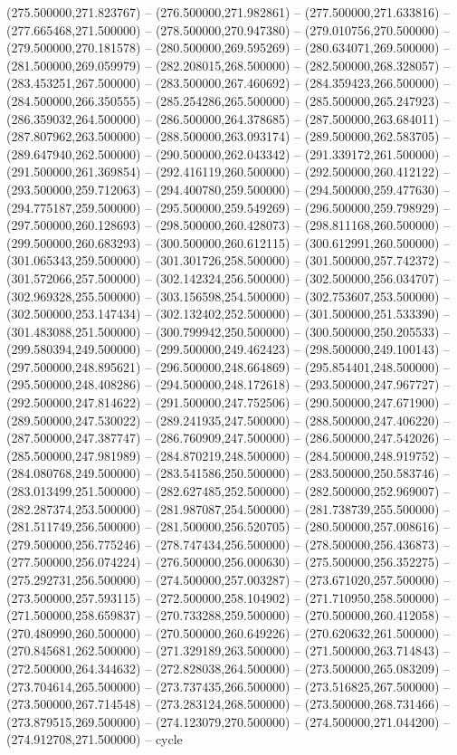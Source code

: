   (275.500000,271.823767) -- (276.500000,271.982861) -- (277.500000,271.633816) -- (277.665468,271.500000) -- (278.500000,270.947380) -- (279.010756,270.500000) -- (279.500000,270.181578) -- (280.500000,269.595269) -- (280.634071,269.500000) -- (281.500000,269.059979) -- (282.208015,268.500000) -- (282.500000,268.328057) -- (283.453251,267.500000) -- (283.500000,267.460692) -- (284.359423,266.500000) -- (284.500000,266.350555) -- (285.254286,265.500000) -- (285.500000,265.247923) -- (286.359032,264.500000) -- (286.500000,264.378685) -- (287.500000,263.684011) -- (287.807962,263.500000) -- (288.500000,263.093174) -- (289.500000,262.583705) -- (289.647940,262.500000) -- (290.500000,262.043342) -- (291.339172,261.500000) -- (291.500000,261.369854) -- (292.416119,260.500000) -- (292.500000,260.412122) -- (293.500000,259.712063) -- (294.400780,259.500000) -- (294.500000,259.477630) -- (294.775187,259.500000) -- (295.500000,259.549269) -- (296.500000,259.798929) -- (297.500000,260.128693) -- (298.500000,260.428073) -- (298.811168,260.500000) -- (299.500000,260.683293) -- (300.500000,260.612115) -- (300.612991,260.500000) -- (301.065343,259.500000) -- (301.301726,258.500000) -- (301.500000,257.742372) -- (301.572066,257.500000) -- (302.142324,256.500000) -- (302.500000,256.034707) -- (302.969328,255.500000) -- (303.156598,254.500000) -- (302.753607,253.500000) -- (302.500000,253.147434) -- (302.132402,252.500000) -- (301.500000,251.533390) -- (301.483088,251.500000) -- (300.799942,250.500000) -- (300.500000,250.205533) -- (299.580394,249.500000) -- (299.500000,249.462423) -- (298.500000,249.100143) -- (297.500000,248.895621) -- (296.500000,248.664869) -- (295.854401,248.500000) -- (295.500000,248.408286) -- (294.500000,248.172618) -- (293.500000,247.967727) -- (292.500000,247.814622) -- (291.500000,247.752506) -- (290.500000,247.671900) -- (289.500000,247.530022) -- (289.241935,247.500000) -- (288.500000,247.406220) -- (287.500000,247.387747) -- (286.760909,247.500000) -- (286.500000,247.542026) -- (285.500000,247.981989) -- (284.870219,248.500000) -- (284.500000,248.919752) -- (284.080768,249.500000) -- (283.541586,250.500000) -- (283.500000,250.583746) -- (283.013499,251.500000) -- (282.627485,252.500000) -- (282.500000,252.969007) -- (282.287374,253.500000) -- (281.987087,254.500000) -- (281.738739,255.500000) -- (281.511749,256.500000) -- (281.500000,256.520705) -- (280.500000,257.008616) -- (279.500000,256.775246) -- (278.747434,256.500000) -- (278.500000,256.436873) -- (277.500000,256.074224) -- (276.500000,256.000630) -- (275.500000,256.352275) -- (275.292731,256.500000) -- (274.500000,257.003287) -- (273.671020,257.500000) -- (273.500000,257.593115) -- (272.500000,258.104902) -- (271.710950,258.500000) -- (271.500000,258.659837) -- (270.733288,259.500000) -- (270.500000,260.412058) -- (270.480990,260.500000) -- (270.500000,260.649226) -- (270.620632,261.500000) -- (270.845681,262.500000) -- (271.329189,263.500000) -- (271.500000,263.714843) -- (272.500000,264.344632) -- (272.828038,264.500000) -- (273.500000,265.083209) -- (273.704614,265.500000) -- (273.737435,266.500000) -- (273.516825,267.500000) -- (273.500000,267.714548) -- (273.283124,268.500000) -- (273.500000,268.731466) -- (273.879515,269.500000) -- (274.123079,270.500000) -- (274.500000,271.044200) -- (274.912708,271.500000) -- cycle
